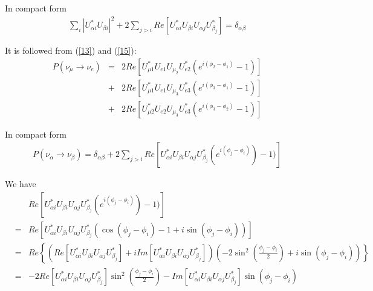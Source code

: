 \documentclass[a4 paper,12pt]{report}%
\begin{document}
In compact form 
   \begin{eqnarray}\label{16}
 \sum_i|U^*_{\alpha i}U_{\beta i}|^2 + 2\sum_{j>i} Re[U^*_{\alpha i}U_{\beta i}U_{\alpha j}U^*_{\beta_j}] =\delta_{\alpha\beta}
   \end{eqnarray} \par
It is followed from (\ref{13}) and (\ref{15}):
   \begin{eqnarray}\label{17}
 P(\nu_\mu \rightarrow \nu_e)
&=& 2Re\left[U^*_{\mu 1}U_{e1}U_{\mu_2}U^*_{e2} \left(e^{i(\phi_2-\phi_1)}-1\right)\right] \nonumber\\
&+& 2Re\left[U^*_{\mu 1}U_{e1}U_{\mu_3}U^*_{e3} \left(e^{i(\phi_3-\phi_1)}-1\right)\right] \nonumber\\
&+& 2Re\left[U^*_{\mu 2}U_{e2}U_{\mu_3}U^*_{e3} \left(e^{i(\phi_3-\phi_2)}-1\right)\right]
   \end{eqnarray} \par

In compact form 
   \begin{eqnarray}\label{18}
P(\nu_\alpha \rightarrow \nu_\beta) =\delta_{\alpha\beta}+ 2\sum_{j>i} Re[U^*_{\alpha i}U_{\beta i}U_{\alpha j}U^*_{\beta_j}(e^{i(\phi_j-\phi_i)})-1)] 
   \end{eqnarray} \par
We have
   \begin{eqnarray}\label{19}
& &Re[U^*_{\alpha i}U_{\beta i}U_{\alpha j}U^*_{\beta_j}(e^{i(\phi_j-\phi_i)})-1)]\nonumber\\
&=& Re[U^*_{\alpha i}U_{\beta i}U_{\alpha j}U^*_{\beta_j}(\cos(\phi_j-\phi_i)-1 +i\sin(\phi_j-\phi_i))]\nonumber\\
&=&Re\left\{(Re[U^*_{\alpha i}U_{\beta i}U_{\alpha j}U^*_{\beta_j}]+ i Im[U^*_{\alpha i}U_{\beta i}U_{\alpha j}U^*_{\beta_j}])(-2\sin^2(\frac{\phi_j-\phi_i}{2})+i\sin(\phi_j-\phi_i))\right\} \nonumber\\
&=&-2Re[U^*_{\alpha i}U_{\beta i}U_{\alpha j}U^*_{\beta_j}]\sin^2(\frac{\phi_j-\phi_i}{2})- Im[U^*_{\alpha i}U_{\beta i}U_{\alpha j}U^*_{\beta_j}]\sin(\phi_j-\phi_i) 
   \end{eqnarray} \par
\end{document}
